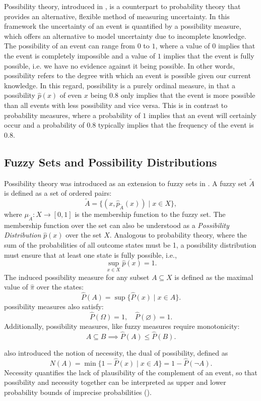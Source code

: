 \documentclass[11pt,a4paper]{report}
\begin{document}
Possibility theory, introduced in \cite{ZADEH19999}, is a counterpart to probability theory that provides an alternative, flexible method of measuring uncertainty. In this framework the uncertainty of an event is quantified by a possibility measure, which offers an alternative to model uncertainty due to incomplete knowledge. The possibility of an event can range from $0$ to $1$, where a value of $0$ implies that the event is completely impossible and a value of $1$ implies that the event is fully possible, i.e. we have no evidence against it being possible. In other words, possibility refers to the degree with which an event is possible given our current knowledge. In this regard, possibility is a purely ordinal measure, in that a possibility $\hat{p}(x)$ of even $x$ being 0.8 only implies that the event is more possible than all events with less possibility and vice versa. This is in contrast to probability measures, where a probability of $1$ implies that an event will certainly occur and a probability of $0.8$ typically implies that the frequency of the event is $0.8$. 

\subsection{Fuzzy Sets and Possibility Distributions}
Possibility theory was introduced as an extension to fuzzy sets in \cite{ZADEH19999}. A fuzzy set $\tilde{A}$ is defined as a set of ordered pairs:
\[
  \tilde{A} = \{(x, \hat{p}_{\tilde{A}}(x)) \mid x \in X\},
\]
where $\mu_{\tilde{A}}: X \to [0,1]$ is the membership function to the fuzzy set. The membership function over the set can also be understood as a \emph{Possibility Distribution} $\hat{p}(x)$ over the set $X$. Analogous to probability theory, where the sum of the probabilities of all outcome states must be 1, a possibility distribution must ensure that at least one state is fully possible, i.e.,
\[
  \sup_{x \in X} \hat{p}(x) = 1.
\]
The induced possibility measure for any subset $A \subseteq X$ is defined as the maximal value of $\hat{\pi}$ over the states:
\[
  \hat{P}(A) = \sup \{ \hat{P}(x) \mid x \in A \}.
\]
possibility measures also satisfy:
\[
\hat{P}(\Omega) = 1,\quad \hat{P}(\varnothing) = 1.
\]
Additionally, possibility measures, like fuzzy measures require monotonicity:
\[
  A \subseteq B \implies \hat{P}(A) \leq \hat{P}(B).
\]
\par
\cite{Dubois2001} also introduced the notion of necessity, the dual of possibility, defined as
\[
  N(A) = \min\{1-\hat{P}(x) \mid x \in A\} = 1 - \hat{P}(\neg A).
\]
Necessity quantifies the lack of plausibility of the complement of an event, so that possibility and necessity together can be interpreted as upper and lower probability bounds of imprecise probabilities (\cite{DUBOIS199265}).
\end{document}
